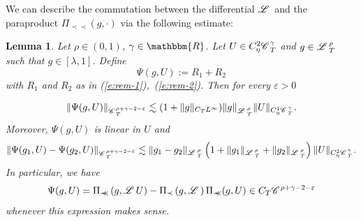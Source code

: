 \documentclass[11pt,reqno]{amsart}
\newcommand{\assign}{:=}
\newcommand{\cdummy}{\cdot}
\newcommand{\precprec}{\prec\!\!\!\prec}
\newtheorem{lemma}[theorem]{Lemma}
\newcommand{\CC}{\mathscr{C} \hspace{.1em}}
\newcommand{\LL}{\mathscr{L} \hspace{.2em}}
\begin{document}
We can describe the commutation between the differential $\LL$ and the
paraproduct $\Pi_{\precprec} (g, \cdummy)$ via the following estimate:

\begin{lemma}
  \label{l:def-psi}Let $\rho \in (0, 1)$, $\gamma \in \mathbbm{R}$. Let $U \in
  C_{\eta}^2 \CC^{\gamma}_T$ and $g \in \LL^{\rho}_T$ such that $g \in
  [\lambda, 1]$. Define
  \[ \Psi (g, U) \assign R_1 + R_2 \]
  with $R_1$ and $R_2$ as in (\ref{e:rem-1}),~(\ref{e:rem-2}). Then for every
  $\varepsilon > 0$
  
  
  \begin{equation}
    \| \Psi (g, U) \|_{\CC_T^{\rho + \gamma - 2 - \varepsilon}} \lesssim (1 +
    \| g \|_{C_T L^{\infty}}) \| g \|_{\LL^{\rho}_T}^{} \| U \|_{C_{\eta}^1
    \CC^{\gamma}_{_T}}  \label{e:psi-est} .
  \end{equation}
  Moreover, $\Psi (g, U)$ is linear in $U$ and
  \[ \| \Psi (g_1, U) - \Psi (g_2, U) \|_{\CC_T^{\rho + \gamma - 2 -
     \varepsilon}} \lesssim \| g_1 - g_2 \|_{\LL^{\rho}_T} \left( 1 + \| g_1
     \|_{\LL^{\rho}_T} + \| g_2 \|_{\LL^{\rho}_T} \right) \| U \|_{C_{\eta}^2
     \CC^{\gamma}_{_T}} . \]
  In particular, we have
  \begin{equation}
    \Psi (g, U) = \Pi_{\precprec} \left( g, \LL U \right) - \Pi_{\prec} \left(
    g, \LL \right) \Pi_{\precprec} (g, U) \in C_T \CC^{\rho + \gamma - 2 -
    \varepsilon}  \label{e:quasidef-psi}
  \end{equation}
  whenever this expression makes sense.
\end{lemma}
\end{document}
